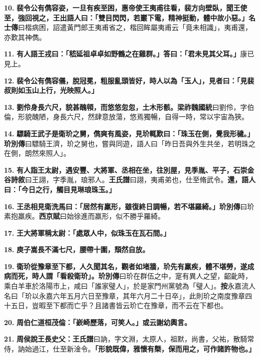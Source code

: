 \textbf{10.} \textbf{裴令公有儁容姿，一旦有疾至困，惠帝使王夷甫往看，裴方向壁臥，聞王使至，強回視之，王出語人曰：「雙目閃閃，若巖下電，精神挺動，體中故小惡。」}{\footnotesize \textbf{名士傳}曰楷病困，詔遣黃門郎王夷甫省之，楷回眸屬夷甫云「竟未相識」，夷甫還，亦歎其神儁。}

\textbf{11.} \textbf{有人語王戎曰：「嵇延祖卓卓如野鶴之在雞群。」答曰：「君未見其父耳。」}{\footnotesize 康已見上。}

\textbf{12.} \textbf{裴令公有儁容儀，脫冠冕，粗服亂頭皆好，時人以為「玉人」，見者曰：「見裴叔則如玉山上行，光映照人。」}

\textbf{13.} \textbf{劉伶身長六尺，貌甚醜顇，而悠悠忽忽，土木形骸。}{\footnotesize \textbf{梁祚魏國統}曰劉伶，字伯倫，形貌醜陋，身長六尺，然肆意放蕩，悠焉獨暢，自得一時，常以宇宙為狹。}

\textbf{14.} \textbf{驃騎王武子是衛玠之舅，儁爽有風姿，見玠輒歎曰：「珠玉在側，覺我形穢。」}{\footnotesize \textbf{玠別傳}曰驃騎王濟，玠之舅也，嘗與同遊，語人曰「昨日吾與外生共坐，若明珠之在側，朗然來照人」。}

\textbf{15.} \textbf{有人詣王太尉，遇安豐、大將軍、丞相在坐，往別屋，見季胤、平子，}{\footnotesize \textbf{石崇金谷詩敘}曰王詡，字季胤，琅邪人。\textbf{王氏譜}曰詡，夷甫弟也，仕至脩武令。}\textbf{還，語人曰：「今日之行，觸目見琳琅珠玉。」}

\textbf{16.} \textbf{王丞相見衛洗馬曰：「居然有羸形，雖復終日調暢，若不堪羅綺。」}{\footnotesize \textbf{玠別傳}曰玠素抱羸疾。\textbf{西京賦}曰始徐進而羸形，似不勝乎羅綺。}

\textbf{17.} \textbf{王大將軍稱太尉：「處眾人中，似珠玉在瓦石間。」}

\textbf{18.} \textbf{庾子嵩長不滿七尺，腰帶十圍，頹然自放。}

\textbf{19.} \textbf{衛玠從豫章至下都，人久聞其名，觀者如堵牆，玠先有羸疾，體不堪勞，遂成病而死，時人謂「看殺衛玠」。}{\footnotesize \textbf{玠別傳}曰玠在群伍之中，寔有異人之望，齠齔時，乘白羊車於洛陽市上，咸曰「誰家璧人」，於是家門州黨號為「璧人」。\textbf{按}永嘉流人名曰「玠以永嘉六年五月六日至豫章，其年六月二十日卒」，此則玠之南度豫章四十五日，豈暇至下都而亡乎？且諸書皆云玠亡在豫章，而不云在下都也。}

\textbf{20.} \textbf{周伯仁道桓茂倫：「嶔崎歷落，可笑人。」或云謝幼輿言。}

\textbf{21.} \textbf{周侯說王長史父：}{\footnotesize \textbf{王氏譜}曰訥，字文淵，太原人，祖默，尚書，父祐，散騎常侍，訥始過江，仕至新淦令。}\textbf{「形貌既偉，雅懷有槩，保而用之，可作諸許物也。」}

